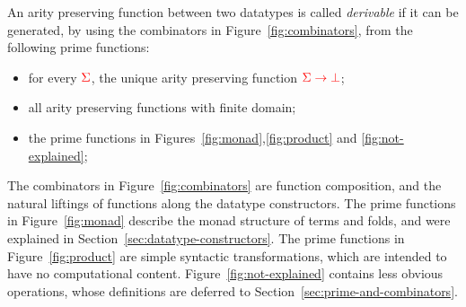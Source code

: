 



\begin{definition}\label{def:derivable-function}
    An  arity preserving function between two datatypes is called \emph{derivable}  if it can be generated, by using the combinators in Figure~\ref{fig:combinators}, from  the following prime functions:
    \begin{itemize}
    \item for every ${\color{red}{\Sigma}}$, the unique arity preserving function ${\color{red}{\Sigma \to {\color{red}{\bot}}}}$;
    \item  all arity preserving functions with finite domain;
        \item  the prime functions in Figures~\ref{fig:monad},\ref{fig:product} and \ref{fig:not-explained};
         \end{itemize}
  

   
\end{definition}



%
The combinators in Figure~\ref{fig:combinators} are  function composition, and the natural liftings of functions along the datatype constructors. 
The prime functions in Figure~\ref{fig:monad} describe the monad structure of terms and folds, and were explained in Section~\ref{sec:datatype-constructors}. The prime functions in Figure~\ref{fig:product} are  simple syntactic transformations, which are intended to have no computational content.  Figure~\ref{fig:not-explained} contains   less obvious operations, whose definitions are  deferred to Section~\ref{sec:prime-and-combinators}. 

